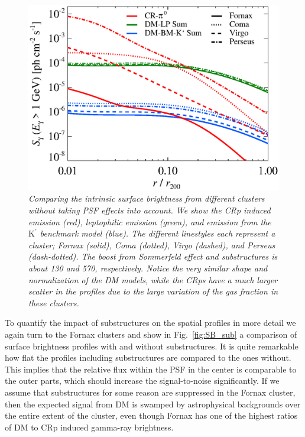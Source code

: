 \documentclass[10pt,aps,pra,reprint,amsmath,amsfonts,amssymb,showpacs,nofootinbib,floatfix]{revtex4-1}
\newcommand{\rmn}{\mathrm}
\newcommand{\Kp}{\rmn{K}^\prime}
\begin{document}
\begin{figure}
 \includegraphics[width=0.99\columnwidth]{figures/SB.v11.1GeV.SF300.SubMass.elmu.eps}
 \caption{\it Comparing the intrinsic surface brightness from
   different clusters without taking PSF effects into account. We show
   the CRp induced emission (red), leptophilic emission (green), and
   emission from the $\Kp$ benchmark model (blue). The different
   linestyles each represent a cluster; Fornax (solid), Coma (dotted),
   Virgo (dashed), and Perseus (dash-dotted). The boost from
   Sommerfeld effect and substructures is about 130 and 570,
   respectively. Notice the very similar shape and normalization of
   the DM models, while the CRps have a much larger scatter in the
   profiles due to the large variation of the gas fraction in these clusters.}
 \label{fig:SB_clu}
\end{figure}

To quantify the impact of substructures on the spatial profiles in
more detail we again turn to the Fornax clusters and show in
Fig.~\ref{fig:SB_sub} a comparison of surface brightness profiles with
and without substructures. It is quite remarkable how flat the
profiles including substructures are compared to the ones
without. This implies that the relative flux within the PSF in the
center is comparable to the outer parts, which should increase the
signal-to-noise significantly. If we assume that substructures for
some reason are suppressed in the Fornax cluster, then the expected
signal from DM is swamped by astrophysical backgrounds over the entire
extent of the cluster, even though Fornax has one of the highest
ratios of DM to CRp induced gamma-ray brightness.
\end{document}
